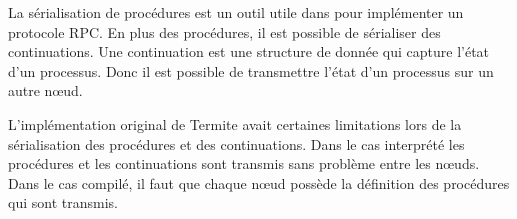 La sérialisation de procédures est un outil utile dans pour implémenter
un protocole RPC. En plus des procédures, il est possible de sérialiser
des continuations. Une continuation est une structure de donnée qui capture
l'état d'un processus. Donc il est possible de transmettre l'état d'un
processus sur un autre nœud.

L'implémentation original de Termite avait certaines limitations
lors de la sérialisation des procédures et des continuations. Dans
le cas interprété les procédures et les continuations sont transmis
sans problème entre les nœuds. Dans le cas compilé, il faut que
chaque nœud possède la définition des procédures qui sont transmis.








